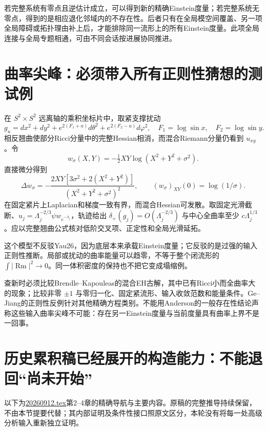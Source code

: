 \documentclass[UTF8,a4paper,11pt,fontset=fandol]{ctexart}
\numberwithin{equation}{section}
\theoremstyle{definition}
\newcommand{\Rm}{\operatorname{Rm}}
\begin{document}
若完整系统有零点且逆估计成立，可以得到新的精确Einstein度量；若完整系统无零点，得到的是相应退化邻域内的不存在性。后者只有在全局模空间覆盖、另一项全局障碍或拓扑理由补上后，才能排除同一流形上的所有Einstein度量。此项全局连接与全局专题相通，可由不同会话按进展协同推进。

\section{曲率尖峰：必须带入所有正则性猜想的测试例}
在 $S^2\times S^2$ 远离轴的乘积坐标片中，取紧支撑扰动
\[
g_u=dx^2+dy^2+e^{2(F_1+u)}d\theta^2+e^{2(F_2-u)}d\varphi^2,
\quad F_1=\log\sin x,\quad F_2=\log\sin y.
\]
相反翘曲使部分Ricci分量中的完整Hessian相消，而混合Riemann分量仍看到 $u_{xy}$。令
\[
w_\sigma(X,Y)=-\tfrac12XY\log(X^2+Y^2+\sigma^2).
\]
直接微分得到
\begin{equation}\label{eq:CZ}
\Delta w_\sigma=-\frac{2XY[3\sigma^2+2(X^2+Y^2)]}{(X^2+Y^2+\sigma^2)^2},
\qquad (w_\sigma)_{XY}(0)=\log(1/\sigma).
\end{equation}
在固定紧片上Laplacian和梯度一致有界，而混合Hessian可发散。取固定光滑截断、$u_j=\Lambda_j^{-2/3}\psi w_{e^{-\Lambda_j}}$，轨迹给出 $\delta_+(g_j)=O(\Lambda_j^{-2/3})$ 与中心全曲率至少 $c\Lambda_j^{1/3}$。应以完整翘曲公式核对低阶交叉项、正定性和全局光滑延拓。

这个模型不反驳Yau26，因为底层本来承载Einstein度量；它反驳的是过强的输入正则性推断。局部或扰动的曲率能量可以趋零，不等于整个闭流形的 $\int|\Rm|^2\to0$。同一体积密度的保持也不把它变成塌缩例。

查新时必须比较Brendle--Kapouleas的混合EH古解，其中已有Ricci小而全曲率大的现象\cite{BK}；比较非零 $\pm1$ 与零归一化、固定紧流形、输入收敛范数和能量条件。Ge--Jiang的正则性反例针对其他精确方程类别\cite{GJ2017}。不能用Anderson的一般存在性结论声称这些输入曲率尖峰不可能：存在另一Einstein度量与当前度量具有曲率上界不是一回事\cite{Anderson1989}。

\section{历史累积稿已经展开的构造能力：不能退回“尚未开始”}
以下为\href{20260912.tex}{20260912.tex}第2--4章的精确导航与主要内容。原稿的完整推导持续保留，不由本节提要代替；其内部证明及条件性接口照原文区分，本轮没有将每一处高级分析输入重新独立证明。
\end{document}
